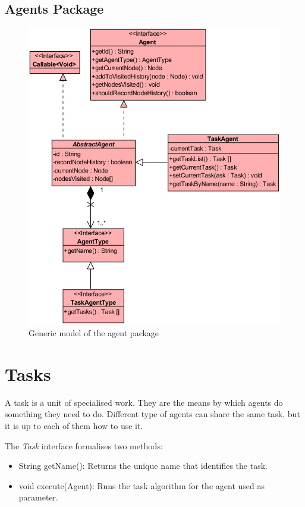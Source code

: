 \subsection{Agents Package}

\begin{figure}[H]
  \centering
  \includegraphics[width=0.9\linewidth]{gfx/uml-agent-package.png}
  \caption{Generic model of the agent package}
  \label{fig:gen-agent-package}
\end{figure}


\section {Tasks}

A task is a unit of specialised work. They are the means by which agents do something they need to do. Different type of agents can share the same task, but it is up to each of them how to use it.

The \emph{Task} interface formalises two methods:

\begin{itemize}
  \item String getName(): Returns the unique name that identifies the task.
  
  \item void execute(Agent): Runs the task algorithm for the agent used as parameter.
\end{itemize}


